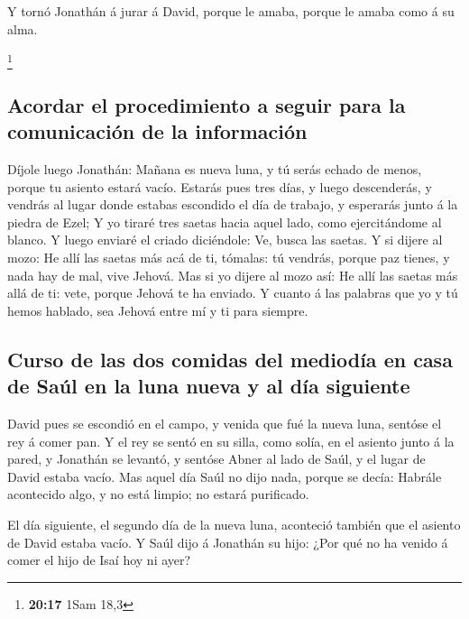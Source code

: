  Y tornó Jonathán á jurar á David, porque le amaba, porque
le amaba como á su alma.

\footnote{\textbf{20:17} 1Sam 18,3}

\hypertarget{acordar-el-procedimiento-a-seguir-para-la-comunicaciuxf3n-de-la-informaciuxf3n}{%
\subsection{Acordar el procedimiento a seguir para la comunicación de la
información}\label{acordar-el-procedimiento-a-seguir-para-la-comunicaciuxf3n-de-la-informaciuxf3n}}

 Díjole luego Jonathán: Mañana es nueva luna, y tú serás
echado de menos, porque tu asiento estará vacío.  Estarás
pues tres días, y luego descenderás, y vendrás al lugar donde estabas
escondido el día de trabajo, y esperarás junto á la piedra de Ezel;
 Y yo tiraré tres saetas hacia aquel lado, como
ejercitándome al blanco.  Y luego enviaré el criado
diciéndole: Ve, busca las saetas. Y si dijere al mozo: He allí las
saetas más acá de ti, tómalas: tú vendrás, porque paz tienes, y nada hay
de mal, vive Jehová.  Mas si yo dijere al mozo así: He allí
las saetas más allá de ti: vete, porque Jehová te ha enviado.
 Y cuanto á las palabras que yo y tú hemos hablado, sea
Jehová entre mí y ti para siempre.

\hypertarget{curso-de-las-dos-comidas-del-medioduxeda-en-casa-de-sauxfal-en-la-luna-nueva-y-al-duxeda-siguiente}{%
\subsection{Curso de las dos comidas del mediodía en casa de Saúl en la
luna nueva y al día
siguiente}\label{curso-de-las-dos-comidas-del-medioduxeda-en-casa-de-sauxfal-en-la-luna-nueva-y-al-duxeda-siguiente}}

 David pues se escondió en el campo, y venida que fué la
nueva luna, sentóse el rey á comer pan.  Y el rey se sentó
en su silla, como solía, en el asiento junto á la pared, y Jonathán se
levantó, y sentóse Abner al lado de Saúl, y el lugar de David estaba
vacío.  Mas aquel día Saúl no dijo nada, porque se decía:
Habrále acontecido algo, y no está limpio; no estará purificado.

 El día siguiente, el segundo día de la nueva luna,
aconteció también que el asiento de David estaba vacío. Y Saúl dijo á
Jonathán su hijo: ¿Por qué no ha venido á comer el hijo de Isaí hoy ni
ayer?

